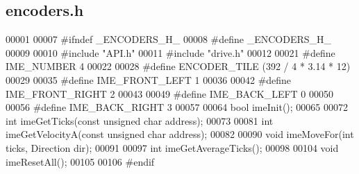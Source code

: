 \subsection{encoders.\+h}
\label{encoders_8h_source}

\begin{DoxyCode}
00001 
00007 \textcolor{preprocessor}{#ifndef \_ENCODERS\_H\_}
00008 \textcolor{preprocessor}{#define \_ENCODERS\_H\_}
00009 
00010 \textcolor{preprocessor}{#include "API.h"}
00011 \textcolor{preprocessor}{#include "drive.h"}
00012 
00021 \textcolor{preprocessor}{#define IME\_NUMBER 4}
00022 
00028 \textcolor{preprocessor}{#define ENCODER\_TILE (392 / 4 * 3.14 * 12)}
00029 
00035 \textcolor{preprocessor}{#define IME\_FRONT\_LEFT 1}
00036 
00042 \textcolor{preprocessor}{#define IME\_FRONT\_RIGHT 2}
00043 
00049 \textcolor{preprocessor}{#define IME\_BACK\_LEFT 0}
00050 
00056 \textcolor{preprocessor}{#define IME\_BACK\_RIGHT 3}
00057 
00064 \textcolor{keywordtype}{bool} imeInit();
00065 
00072 \textcolor{keywordtype}{int} imeGetTicks(\textcolor{keyword}{const} \textcolor{keywordtype}{unsigned} \textcolor{keywordtype}{char} address);
00073 
00081 \textcolor{keywordtype}{int} imeGetVelocityA(\textcolor{keyword}{const} \textcolor{keywordtype}{unsigned} \textcolor{keywordtype}{char} address);
00082 
00090 \textcolor{keywordtype}{void} imeMoveFor(\textcolor{keywordtype}{int} ticks, Direction dir);
00091 
00097 \textcolor{keywordtype}{int} imeGetAverageTicks();
00098 
00104 \textcolor{keywordtype}{void} imeResetAll();
00105 
00106 \textcolor{preprocessor}{#endif}
\end{DoxyCode}
